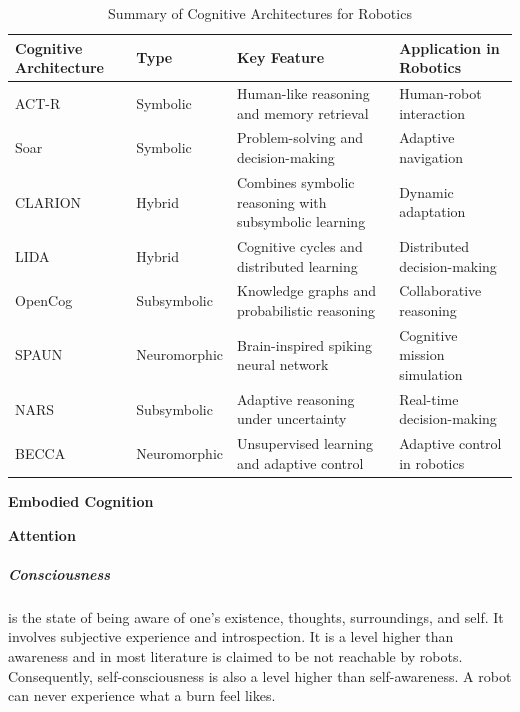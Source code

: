 \documentclass{book}
\providecommand{\ProjectDeepHeading}[2]{%
    \par\medskip\noindent\textbf{#2}\par\smallskip
}
\begin{document}
            \begin{table}[h!]
                \centering
                \begin{tabular}{|l|l|l|l|}
                    \hline
                    \textbf{Cognitive Architecture} & \textbf{Type} & \textbf{Key Feature} & \textbf{Application in Robotics} \\ \hline
                    ACT-R & Symbolic & Human-like reasoning and memory retrieval & Human-robot interaction  \\ \hline
                    Soar & Symbolic & Problem-solving and decision-making & Adaptive navigation  \\ \hline
                    CLARION & Hybrid & Combines symbolic reasoning with subsymbolic learning & Dynamic adaptation  \\ \hline
                    LIDA & Hybrid & Cognitive cycles and distributed learning & Distributed decision-making  \\ \hline
                    OpenCog & Subsymbolic & Knowledge graphs and probabilistic reasoning & Collaborative reasoning  \\ \hline
                    SPAUN & Neuromorphic & Brain-inspired spiking neural network & Cognitive mission simulation  \\ \hline
                    NARS & Subsymbolic & Adaptive reasoning under uncertainty & Real-time decision-making  \\ \hline
                    BECCA & Neuromorphic & Unsupervised learning and adaptive control & Adaptive control in robotics  \\ \hline
                \end{tabular}
                \caption{Summary of Cognitive Architectures for Robotics}
            \end{table}




    \ProjectDeepHeading{1}{Embodied Cognition}

    \ProjectDeepHeading{1}{Attention}



\subparagraph{Consciousness} is the state of being aware of one’s existence, thoughts, surroundings, and self. It involves subjective experience and introspection. It is a level higher than awareness and in most literature is claimed to be not reachable by robots. Consequently, self-consciousness is also a level higher than self-awareness. A robot can never experience what a burn feel likes.
\end{document}
